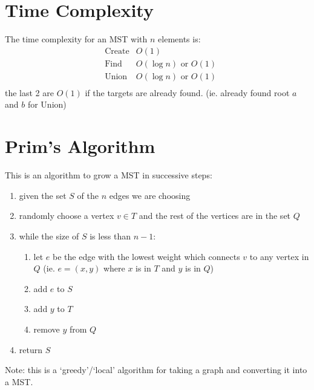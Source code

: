 \documentclass[12pt]{book}
\title{\coursetitle\linebreak\lecturename}
\author{\\Cain Susko\\ 
           \\ \\ \\
      Queen's University 
    \\School of Computing\\}
\begin{document}
\begin{titlepage}
        \maketitle
\end{titlepage}


\section*{Time Complexity}
The time complexity for an MST with $n$ elements is:
\begin{align*}
        &\text{Create} &O(1)\\
        &\text{Find} &O(\log n)\text{ or }O(1)\\
        &\text{Union} &O(\log n)\text{ or }O(1)\\
\end{align*}
the last 2 are $O(1)$ if the targets are already found. (ie. already found root $a$ and $b$ for Union)

\section*{Prim's Algorithm}
This is an algorithm to grow a MST in successive steps:
\begin{enumerate}
        \item given the set $S$ of the $n$ edges we are choosing
        \item randomly choose a vertex $v \in T$ and the rest of the vertices are in the set $Q$
        \item while the size of $S$ is less than $n-1$:
                \begin{enumerate}
                        \item let $e$ be the edge with the lowest weight which connects $v$ to any vertex in $Q$ (ie. $e=(x,y)$ where $x$ is in 
                                $T$ and $y$ is in $Q$)
                        \item add $e$ to $S$
                        \item add $y$ to $T$
                        \item remove $y$ from $Q$
                \end{enumerate}
        \item return $S$
\end{enumerate}
Note: this  is a `greedy'/`local' algorithm for taking a 
graph and converting it into a MST. 
\end{document}

